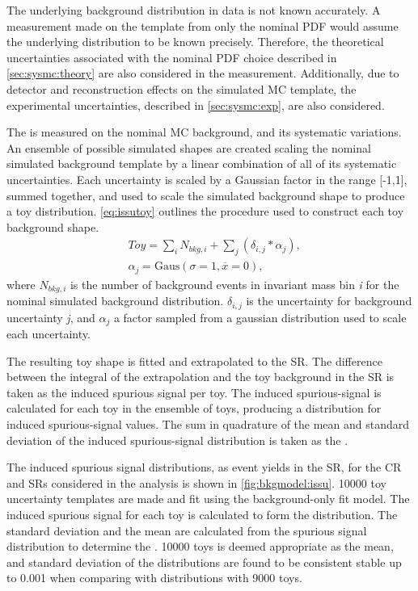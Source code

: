 The underlying background distribution in data is not known accurately. A \ISSU measurement made on the template from only the nominal PDF would assume the underlying distribution to be known precisely. Therefore, the theoretical uncertainties associated with the nominal PDF choice described in \cref{sec:sysmc:theory} are also considered in the \ISSU measurement. Additionally, due to detector and reconstruction effects on the simulated MC template, the experimental uncertainties, described in \cref{sec:sysmc:exp}, are also considered. 

The \ISSU is measured on the nominal MC background, and its systematic variations. An ensemble of possible simulated shapes are created scaling the nominal simulated background template by a linear combination of all of its systematic uncertainties. Each uncertainty is scaled by a Gaussian factor in the range [-1,1], summed together, and used to scale the simulated background shape to produce a toy distribution. \cref{eq:issutoy} outlines the procedure used to construct each toy background shape. 
\begin{equation}
    \label{eq:issutoy}
    \begin{aligned}
        & Toy = \sum_{i} N_{bkg,i} + \sum_{j} \left(\delta_{i,j} * \alpha_{j}\right), \\
        & \alpha_j = \mathrm{Gaus}(\sigma=1,\overline{x}=0),
    \end{aligned}
\end{equation}
where $N_{bkg,i}$ is the number of background events in invariant mass bin \emph{i} for the nominal simulated background distribution. $\delta_{i,j}$ is the uncertainty for background uncertainty \emph{j}, and $\alpha_j$ a factor sampled from a gaussian distribution used to scale each uncertainty.

The resulting toy shape is fitted and extrapolated to the SR. The difference between the integral of the extrapolation and the toy background in the SR is taken as the induced spurious signal per toy. The induced spurious-signal is calculated for each toy in the ensemble of toys, producing a distribution for induced spurious-signal values. The sum in quadrature of the mean and standard deviation of the induced spurious-signal distribution is taken as the \ISSU. 

The induced spurious signal distributions, as event yields in the SR, for the CR and SRs considered in the analysis is shown in \cref{fig:bkgmodel:issu}. 10000 toy uncertainty templates are made and fit using the background-only fit model. The induced spurious signal for each toy is calculated to form the distribution. The standard deviation and the mean are calculated from the spurious signal distribution to determine the \ISSU. 10000 toys is deemed appropriate as the mean, and standard deviation of the distributions are found to be consistent stable up to 0.001 when comparing with distributions with 9000 toys.

